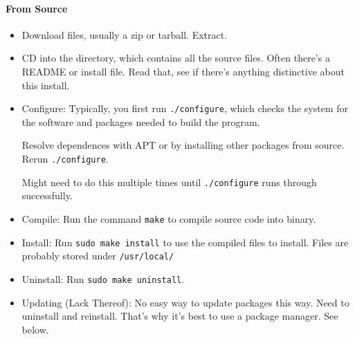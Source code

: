 \documentclass[12pt]{article}
\theoremstyle{plain}
\theoremstyle{definition}
\theoremstyle{remark}
\begin{document}
\paragraph{From Source}
\begin{itemize}
  \item Download files, usually a zip or tarball. Extract.

  \item CD into the directory, which contains all the source files.
    Often there's a README or install file. Read that, see if there's
    anything distinctive about this install.

  \item Configure:
    Typically, you first run \texttt{./configure}, which checks the
    system for the software and packages needed to build the program.

    Resolve dependences with APT or by installing other packages
    from source. Rerun \texttt{./configure}.

    Might need to do this multiple times until \texttt{./configure} runs
    through successfully.

  \item Compile:
    Run the command \texttt{make} to compile source code into binary.

  \item Install:
    Run \texttt{sudo make install} to use the compiled files to install.
    Files are probably stored under \texttt{/usr/local/}

  \item Uninstall:
    Run \texttt{sudo make uninstall}.

  \item Updating (Lack Thereof):
    No easy way to update packages this way.
    Need to uninstall and reinstall.
    That's why it's best to use a package manager.
    See below.
\end{itemize}


\clearpage
\end{document}
